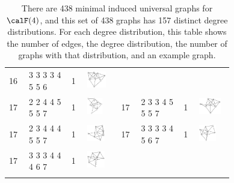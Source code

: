 \begin{footnotesize}
\begin{longtable}{
        m{0.05\linewidth} m{0.15\linewidth} m{0.05\linewidth} m{0.12\linewidth} |
        m{0.05\linewidth} m{0.15\linewidth} m{0.05\linewidth} m{0.12\linewidth}
    }
16 & 3 3 3 3 4 5 5 6 & 1 & \includegraphics[height=0.7151cm]{15-universal-graphs/img/degree-sequences-example-graphs/graph-4-8-151}\\
17 & 2 2 4 4 5 5 5 7 & 1 & \includegraphics[height=0.7151cm]{15-universal-graphs/img/degree-sequences-example-graphs/graph-4-8-152} &
17 & 2 3 3 4 5 5 5 7 & 1 & \includegraphics[height=0.7151cm]{15-universal-graphs/img/degree-sequences-example-graphs/graph-4-8-153}\\
17 & 2 3 4 4 4 5 5 7 & 1 & \includegraphics[height=0.7151cm]{15-universal-graphs/img/degree-sequences-example-graphs/graph-4-8-154} &
17 & 3 3 3 3 4 5 6 7 & 1 & \includegraphics[height=0.7151cm]{15-universal-graphs/img/degree-sequences-example-graphs/graph-4-8-155}\\
17 & 3 3 3 4 4 4 6 7 & 1 & \includegraphics[height=0.7151cm]{15-universal-graphs/img/degree-sequences-example-graphs/graph-4-8-156}\\
\bottomrule
\caption{There are 438 minimal induced universal graphs for $\calF(4)$, and this set of
    438 graphs has 157 distinct degree distributions.  For each degree distribution,
    this table shows the number of edges, the
    degree distribution, the number of graphs with that distribution,
    and an example graph.}
\label{tab:f4-degree-distributions}
\end{longtable}
\end{footnotesize}

